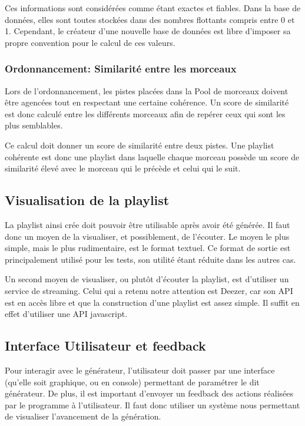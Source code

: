 Ces informations sont considérées comme étant exactes et fiables. Dans la base 
de données, elles sont toutes stockées dans des nombres flottants compris entre 
0 et 1. Cependant, le créateur d'une nouvelle base de données est libre 
d'imposer sa propre convention pour le calcul de ces valeurs.

\subsubsection{Ordonnancement: Similarité entre les morceaux}
\label{besoins:fonc:generation:selection:ordonnancement}

Lors de l'ordonnancement, les pistes placées dans la Pool de morceaux doivent 
être agencées tout en respectant une certaine cohérence. Un score 
de similarité est donc calculé entre les différents morceaux 
afin de repérer ceux qui sont les plus semblables.

Ce calcul doit donner un score de similarité entre deux pistes. Une playlist 
cohérente est donc une playlist dans laquelle chaque morceau possède un score 
de similarité élevé avec le morceau qui le précède et celui qui le suit.

\subsection{Visualisation de la playlist}
\label{besoins:fonc:generation:visu}

La playlist ainsi crée doit pouvoir être utilisable après avoir été générée. 
Il faut donc un moyen de la visualiser, et possiblement, de l’écouter. Le 
moyen le plus simple, mais le plus rudimentaire, est le format textuel. Ce 
format de sortie est principalement utilisé pour les tests, son utilité étant 
réduite dans les autres cas.

Un second moyen de visualiser, ou plutôt d'écouter la playlist, est d’utiliser 
un service de streaming. Celui qui a retenu notre attention est Deezer, car son 
API est en accès libre et que la construction d'une playlist est assez simple. 
Il suffit en effet d’utiliser une API javascript.
        
\subsection{Interface Utilisateur et feedback}
\label{besoins:fonc:generation:feedback}

Pour interagir avec le générateur, l’utilisateur doit passer par une interface 
(qu'elle soit graphique, ou en console) permettant de paramétrer le dit 
générateur. De plus, il est important d’envoyer un feedback des actions 
réalisées par le programme à l’utilisateur. Il faut donc utiliser un système 
nous permettant de visualiser l’avancement de la génération.

